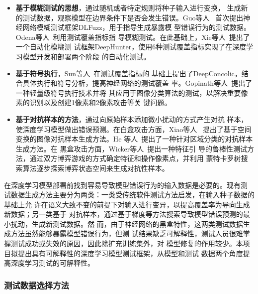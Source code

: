 \begin{itemize}
	\item \textbf{基于模糊测试的思想}，通过随机或者特定规则将种子输入进行变换，
	生成新的测试数据，观察模型在边界条件下是否会发生错误。Guo等人
	~\cite{Guo2018DLFuzz}首次提出神经网络模糊测试框架DLFuzz，用于指导生成暴露模
	型错误行为的测试数据。Odena等人~\cite{Odena2019TensorFuzz}利用测试覆盖指标指
	导模糊测试。在此基础上，Xie等人~\cite{xie2019coverage}提出了一个自动化模糊测
	试框架DeepHunter，使用6种测试覆盖指标实现了在深度学习模型开发和部署两个阶段
	的自动化测试。

	\item \textbf{基于符号执行}，Sun等人~\cite{Sun2018Concolic}在测试覆盖指标的
	基础上提出了DeepConcolic，结合具体执行和符号分析，提高神经网络的测试覆盖
	率。Gopinath等人~\cite{Gopinath2018Symbolic}提出了一种轻量级符号执行技术并将
	其应用于图像分类算法的测试，以解决重要像素的识别以及创建1像素和2像素攻击等关
	键问题。

	\item \textbf{基于对抗样本的方法}，通过向原始样本添加微小扰动的方式产生对抗
	      样本，使深度学习模型做出错误预测。在白盒攻击方面，Xiao等人
	      ~\cite{Xiao2018Spatially}提出了基于空间变换的图像对抗样本生成方法。He
	      等人~\cite{He2018Decision}提出了一种针对区域分类的对抗样本生成方法。在
	      黑盒攻击方面，Wicker等人~\cite{Wicker2018FeatureGuided}提出一种特征引
	      导的鲁棒性测试方法，通过双方博弈游戏的方式确定特征和操作像素点，并利用
	      蒙特卡罗树搜索算法逐步探索博弈状态空间来生成对抗性样本。
\end{itemize}


{\kaishu 在深度学习模型部署前找到容易导致模型错误行为的输入数据是必要的。现有测
试数据生成方法主要分为两类：一类受传统软件测试方法启发，在输入种子数据的基础上允
许在语义大致不变的前提下对输入进行变异，以提高覆盖率为导向生成新数据；另一类基于
对抗样本，通过基于梯度等方法搜索导致模型错误预测的最小扰动，生成新测试数据。然
而，由于神经网络的黑盒特性，这两类测试数据生成方法虽然能够暴露模型错误行为，但测
试结果缺乏可解释性，测试人员很难掌握测试成功或失效的原因，因此除扩充训练集外，对
模型修复的作用较少。本项目拟提出具有可解释性的深度学习模型测试框架，从模型和测试
数据两个角度提高深度学习测试的可解释性。}













\subsubsection{测试数据选择方法}

